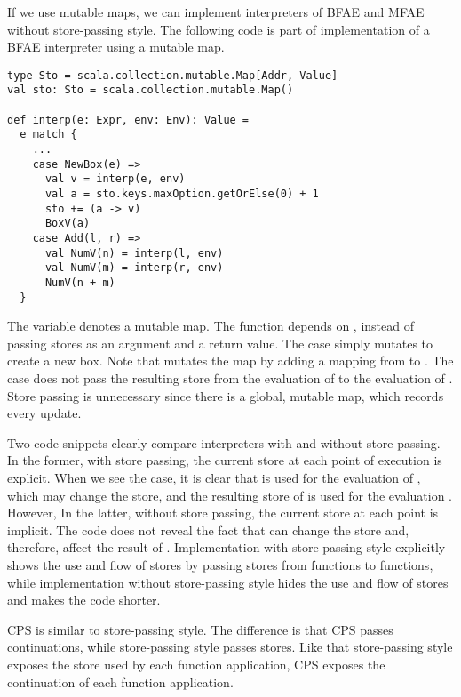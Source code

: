 If we use mutable maps, we can implement interpreters of
\textsf{BFAE} and \textsf{MFAE} without store-passing style. The following code
is part of implementation of a \textsf{BFAE} interpreter using a mutable map.
\begin{verbatim}
type Sto = scala.collection.mutable.Map[Addr, Value]
val sto: Sto = scala.collection.mutable.Map()

def interp(e: Expr, env: Env): Value =
  e match {
    ...
    case NewBox(e) =>
      val v = interp(e, env)
      val a = sto.keys.maxOption.getOrElse(0) + 1
      sto += (a -> v)
      BoxV(a)
    case Add(l, r) =>
      val NumV(n) = interp(l, env)
      val NumV(m) = interp(r, env)
      NumV(n + m)
  }
\end{verbatim}
The variable  denotes a mutable map. The function 
depends on , instead of passing stores as an argument and a return value.
The  case simply mutates  to create a new box.
Note that  mutates the map by adding a mapping from
 to .
The  case does not pass the resulting store from the evaluation of
 to the evaluation of . Store passing is unnecessary since there
is a global, mutable map, which records every update.

Two code snippets clearly compare interpreters with and without store passing.
In the former, with store passing, the current store at each point of execution
is explicit. When we see the  case, it is clear that
 is used for the evaluation of , which may change the store,
and the resulting store of  is used for the evaluation .
However, In the latter, without store passing, the current store at each point
is implicit. The code does not reveal the fact that  can change the store and, therefore, affect the result of . Implementation with store-passing style explicitly shows the use and flow of
stores by passing stores from functions to functions, while implementation
without store-passing style hides the use and flow of stores and makes the code
shorter.

CPS is similar to store-passing style. The difference is that CPS passes
continuations, while store-passing style passes stores. Like that store-passing
style exposes the store used by each function application, CPS exposes the
continuation of each function application.

